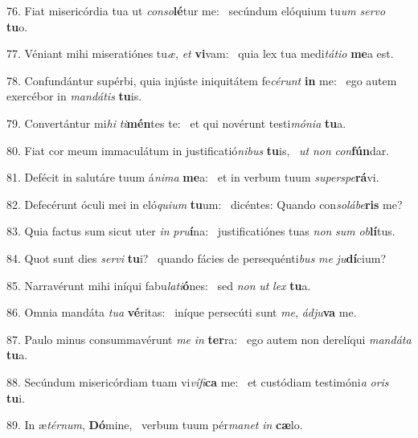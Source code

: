 76. Fiat misericórdia tua ut \textit{con}\textit{so}\textbf{lé}tur me: \ast\  secúndum elóquium tu\textit{um} \textit{ser}\textit{vo} \textbf{tu}o.\

77. Véniant mihi miseratiónes tu\textit{æ}, \textit{et} \textbf{vi}vam: \ast\  quia lex tua medi\textit{tá}\textit{ti}\textit{o} \textbf{me}a est.\

78. Confundántur supérbi, quia injúste iniquitátem fe\textit{cé}\textit{runt} \textbf{in} me: \ast\  ego autem exercébor in \textit{man}\textit{dá}\textit{tis} \textbf{tu}is.\

79. Convertántur mi\textit{hi} \textit{ti}\textbf{mén}tes te: \ast\  et qui novérunt testi\textit{mó}\textit{ni}\textit{a} \textbf{tu}a.\

80. Fiat cor meum immaculátum in justificatió\textit{ni}\textit{bus} \textbf{tu}is, \ast\  \textit{ut} \textit{non} \textit{con}\textbf{fún}dar.\

81. Defécit in salutáre tuum á\textit{ni}\textit{ma} \textbf{me}a: \ast\  et in verbum tuum \textit{su}\textit{per}\textit{spe}\textbf{rá}vi.\

82. Defecérunt óculi mei in eló\textit{qui}\textit{um} \textbf{tu}um: \ast\  dicéntes: Quando con\textit{so}\textit{lá}\textit{be}\textbf{ris} me?\

83. Quia factus sum sicut uter \textit{in} \textit{pru}\textbf{í}na: \ast\  justificatiónes tuas \textit{non} \textit{sum} \textit{ob}\textbf{lí}tus.\

84. Quot sunt dies \textit{ser}\textit{vi} \textbf{tu}i? \ast\  quando fácies de persequénti\textit{bus} \textit{me} \textit{ju}\textbf{dí}cium?\

85. Narravérunt mihi iníqui fabu\textit{la}\textit{ti}\textbf{ó}nes: \ast\  sed \textit{non} \textit{ut} \textit{lex} \textbf{tu}a.\

86. Omnia mandáta \textit{tu}\textit{a} \textbf{vé}ritas: \ast\  iníque persecúti sunt \textit{me}, \textit{ád}\textit{ju}\textbf{va} me.\

87. Paulo minus consummavérunt \textit{me} \textit{in} \textbf{ter}ra: \ast\  ego autem non derelíqui \textit{man}\textit{dá}\textit{ta} \textbf{tu}a.\

88. Secúndum misericórdiam tuam vi\textit{ví}\textit{fi}\textbf{ca} me: \ast\  et custódiam testimóni\textit{a} \textit{o}\textit{ris} \textbf{tu}i.\

89. In æ\textit{tér}\textit{num}, \textbf{Dó}mine, \ast\  verbum tuum pér\textit{ma}\textit{net} \textit{in} \textbf{cæ}lo.\

